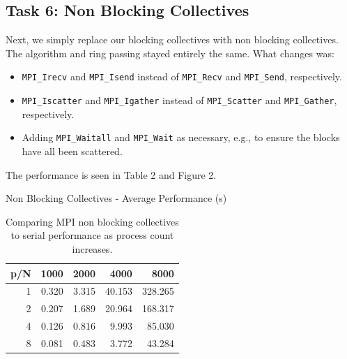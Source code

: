 \documentclass{article}
\begin{document}
\subsection*{Task 6: Non Blocking Collectives}
Next, we simply replace our blocking collectives with non blocking collectives. 
The algorithm and ring passing stayed entirely the same. What changes was:
\begin{itemize}
    \item \texttt{MPI\_Irecv} and \texttt{MPI\_Isend} instead of \texttt{MPI\_Recv} and \texttt{MPI\_Send}, respectively.
    \item \texttt{MPI\_Iscatter} and \texttt{MPI\_Igather} instead of \texttt{MPI\_Scatter} and \texttt{MPI\_Gather}, respectively.
    \item Adding \texttt{MPI\_Waitall} and \texttt{MPI\_Wait} as necessary, e.g., to ensure the blocks have all been scattered.
\end{itemize}
The performance is seen in Table 2 and Figure 2.
\begin{table}[H]
    \centering
    \caption{Non Blocking Collectives - Average Performance (s)}
    \fontsize{12}{14}\selectfont
    \begin{tabular}[t]{rrrrr}
    \toprule
    p/N & 1000 & 2000 & 4000 & 8000\\
    \midrule
    1 & 0.320 & 3.315 & 40.153 & 328.265\\
    2 & 0.207 & 1.689 & 20.964 & 168.317\\
    4 & 0.126 & 0.816 & 9.993 & 85.030\\
    8 & 0.081 & 0.483 & 3.772 & 43.284\\
    \bottomrule
    \end{tabular}
    \caption*{Comparing MPI non blocking collectives to serial performance as process count increases.}
\end{table}
\end{document}
